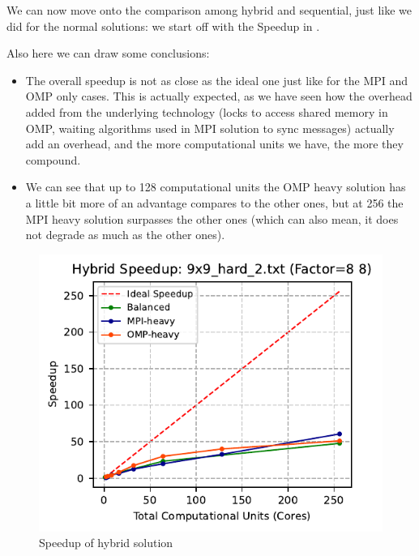 We can now move onto the comparison among hybrid and sequential, just like we did for the normal solutions: we start off with the Speedup in .

Also here we can draw some conclusions:
\begin{itemize}
    \item The overall speedup is not as close as the ideal one just like for the MPI and OMP only cases. This is actually expected, as we have seen how the overhead added from the underlying technology (locks to access shared memory in OMP, waiting algorithms used in MPI solution to sync messages) actually add an overhead, and the more computational units we have, the more they compound.
    \item We can see that up to 128 computational units the OMP heavy solution has a little bit more of an advantage compares to the other ones, but at 256 the MPI heavy solution surpasses the other ones (which can also mean, it does not degrade as much as the other ones).
\end{itemize}


\begin{figure}[htbp]
\centering
\includegraphics[width=0.9\linewidth]{imgs/speedup_hybrid_9x9_hard_2.pdf}
\caption{Speedup of hybrid solution}
\label{fig:speedup_hybrid}
\end{figure}


